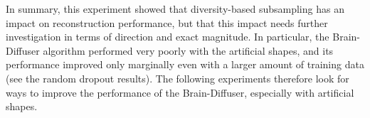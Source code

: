 

In summary, this experiment showed that diversity-based subsampling has an impact on reconstruction performance, but that this impact needs further investigation in terms of direction and exact magnitude. In particular, the Brain-Diffuser algorithm performed very poorly with the artificial shapes, and its  performance improved only marginally even with a larger amount of training data (see the random dropout results). The following experiments therefore look for ways to improve the performance of the Brain-Diffuser, especially with artificial shapes.

